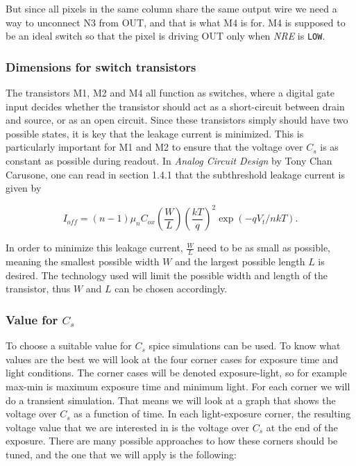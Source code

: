 But since all pixels in the same column share the same output wire we need a way to unconnect N3 from OUT, and that is what M4 is for. M4 is supposed to be an ideal switch so that the pixel is driving OUT only when \emph{NRE} is \verb|LOW|.

\subsubsection{Dimensions for switch transistors}
\label{sec:switch_dimensions}
The transistors M1, M2 and M4 all function as switches, where a digital gate input decides whether the transistor should act as a short-circuit between drain and source, or as an open circuit. Since these transistors simply should have two possible states, it is key that the leakage current is minimized. This is particularly important for M1 and M2 to ensure that the voltage over $C_s$ is as constant as possible during readout. In \emph{Analog Circuit Design} by Tony Chan Carusone, one can read in section 1.4.1 that the subthreshold leakage current is given by

\begin{equation}
    \label{eq:leakage}
    I_{off} = (n-1) \mu_n C_{ox} \left( \frac{W}{L} \right) \left( \frac{kT}{q} \right)^2 \exp{(-qV_t / nkT)}.
\end{equation}

In order to minimize this leakage current, $\frac{W}{L}$ need to be as small as possible, meaning the smallest possible width $W$ and the largest possible length $L$ is desired. The technology used will limit the possible width and length of the transistor, thus $W$ and $L$ can be chosen accordingly.

\subsubsection{Value for $C_s$}

To choose a suitable value for $C_s$ spice simulations can be used. To know what values are the best we will look at the four corner cases for exposure time and light conditions. The corner cases will be denoted exposure-light, so for example max-min is maximum exposure time and minimum light. For each corner we will do a transient simulation. That means we will look at a graph that shows the voltage over $C_s$ as a function of time. In each light-exposure corner, the resulting voltage value that we are interested in is the voltage over $C_s$ at the end of the exposure. There are many possible approaches to how these corners should be tuned, and the one that we will apply is the following:

